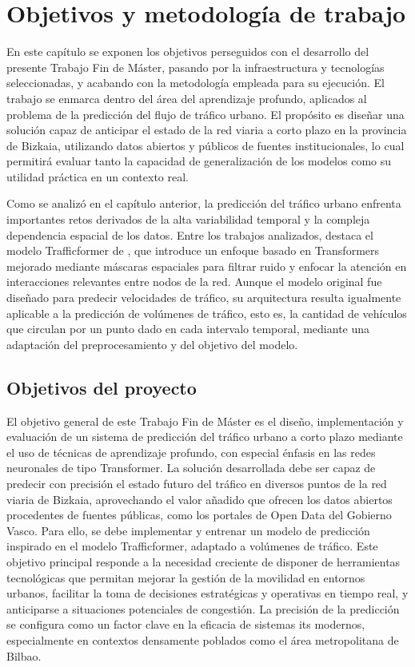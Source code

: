 \section*{Objetivos y metodología de trabajo}
\label{sec:obj_metd}

En este capítulo se exponen los objetivos perseguidos con el desarrollo del presente Trabajo Fin de Máster, pasando por la infraestructura y tecnologías seleccionadas, y acabando con la metodología empleada para su ejecución. El trabajo se enmarca dentro del área del aprendizaje profundo, aplicados al problema de la predicción del flujo de tráfico urbano. El propósito es diseñar una solución capaz de anticipar el estado de la red viaria a corto plazo en la provincia de Bizkaia, utilizando datos abiertos y públicos de fuentes institucionales, lo cual permitirá evaluar tanto la capacidad de generalización de los modelos como su utilidad práctica en un contexto real. 

Como se analizó en el capítulo anterior, la predicción del tráfico urbano enfrenta importantes retos derivados de la alta variabilidad temporal y la compleja dependencia espacial de los datos. Entre los trabajos analizados, destaca el modelo Trafficformer de \cite{trafficformer}, que introduce un enfoque basado en Transformers mejorado mediante máscaras espaciales para filtrar ruido y enfocar la atención en interacciones relevantes entre nodos de la red. Aunque el modelo original fue diseñado para predecir velocidades de tráfico, su arquitectura resulta igualmente aplicable a la predicción de volúmenes de tráfico, esto es, la cantidad de vehículos que circulan por un punto dado en cada intervalo temporal, mediante una adaptación del preprocesamiento y del objetivo del modelo.

\subsection{Objetivos del proyecto}

El objetivo general de este Trabajo Fin de Máster es el diseño, implementación y evaluación de un sistema de predicción del tráfico urbano a corto plazo mediante el uso de técnicas de aprendizaje profundo, con especial énfasis en las redes neuronales de tipo Transformer. La solución desarrollada debe ser capaz de predecir con precisión el estado futuro del tráfico en diversos puntos de la red viaria de Bizkaia, aprovechando el valor añadido que ofrecen los datos abiertos procedentes de fuentes públicas, como los portales de Open Data del Gobierno Vasco. Para ello, se debe implementar y entrenar un modelo de predicción inspirado en el modelo Trafficformer, adaptado a volúmenes de tráfico. Este objetivo principal responde a la necesidad creciente de disponer de herramientas tecnológicas que permitan mejorar la gestión de la movilidad en entornos urbanos, facilitar la toma de decisiones estratégicas y operativas en tiempo real, y anticiparse a situaciones potenciales de congestión. La precisión de la predicción se configura como un factor clave en la eficacia de sistemas \acrshort{its} modernos, especialmente en contextos densamente poblados como el área metropolitana de Bilbao. 

